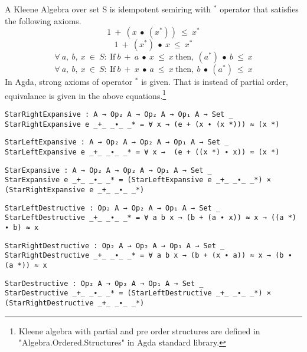 A Kleene Algebra over set S is idempotent semiring with $^{*}$
operator that satisfies the following axioms.
\begin{equation}\label{eq_starrightexpansive}
1\ +\ (x\ ∙\ (x^{*}))\ \leq\ x^{*}
\end{equation}
\begin{equation}\label{eq_starleftexpansive}
1\ +\ (x^{*})\ ∙\ x\ \leq\ x^{*}
\end{equation}
\begin{equation}\label{eq_starleftdestructive}
\forall\ a,\ b,\ x\ \in\ S:\ \text{If} \ b\ +\ a\  ∙\ x\ \leq\ x\ \text{then},\ (a^{*})\ ∙\ b\ \leq\ x
\end{equation}
\begin{equation}\label{eq_starrightdestructive}
\forall\ a,\ b,\ x\ \in\ S:\ \text{If} \ b\ +\ x\ ∙\ a\ \leq\ x \  \text{then},\ b\ ∙\ (a^{*})\ \leq\ x
\end{equation}
In Agda, strong axioms of operator $^{*}$ is given. That is instead of
partial order, equivalance is given in the above equations.\footnote{ Kleene algebra with
partial and pre order structures are defined in "Algebra.Ordered.Structures" in
Agda standard library.}
\begin{verbatim}
StarRightExpansive : A → Op₂ A → Op₂ A → Op₁ A → Set _
StarRightExpansive e _+_ _∙_ _* = ∀ x → (e + (x ∙ (x *))) ≈ (x *)
\end{verbatim}
\begin{verbatim}
StarLeftExpansive : A → Op₂ A → Op₂ A → Op₁ A → Set _
StarLeftExpansive e _+_ _∙_ _* = ∀ x →  (e + ((x *) ∙ x)) ≈ (x *)
\end{verbatim}
\begin{verbatim}
StarExpansive : A → Op₂ A → Op₂ A → Op₁ A → Set _
StarExpansive e _+_ _∙_ _* = (StarLeftExpansive e _+_ _∙_ _*) × (StarRightExpansive e _+_ _∙_ _*)
\end{verbatim}
\begin{verbatim}
StarLeftDestructive : Op₂ A → Op₂ A → Op₁ A → Set _
StarLeftDestructive _+_ _∙_ _* = ∀ a b x → (b + (a ∙ x)) ≈ x → ((a *) ∙ b) ≈ x
\end{verbatim}
\begin{verbatim}
StarRightDestructive : Op₂ A → Op₂ A → Op₁ A → Set _
StarRightDestructive _+_ _∙_ _* = ∀ a b x → (b + (x ∙ a)) ≈ x → (b ∙ (a *)) ≈ x
\end{verbatim}
\begin{verbatim}
StarDestructive : Op₂ A → Op₂ A → Op₁ A → Set _
StarDestructive _+_ _∙_ _* = (StarLeftDestructive _+_ _∙_ _*) × (StarRightDestructive _+_ _∙_ _*)
\end{verbatim}
